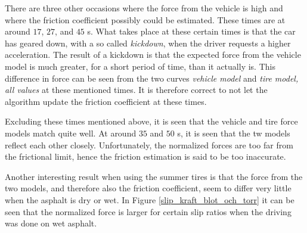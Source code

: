 There are three other occasions where the force from the vehicle is high and where the friction coefficient possibly could be estimated. These times are at around $ 17 $, $ 27 $, and $ 45 $ s. What takes place at these certain times is that the car has geared down, with a so called \textit{kickdown}, when the driver requests a higher acceleration. The result of a kickdown is that the expected force from the vehicle model is much greater, for a short period of time, than it actually is. This difference in force can be seen from the two curves \textit{vehicle model} and \textit{tire model, all values} at these mentioned times. It is therefore correct to not let the algorithm update the friction coefficient at these times.

Excluding these times mentioned above, it is seen that the vehicle and tire force models match quite well. At around $ 35 $ and $ 50 $ s, it is seen that the tw models reflect each other closely. Unfortunately, the normalized forces are too far from the frictional limit, hence the friction estimation is said to be too inaccurate. 

Another interesting result when using the summer tires is that the force from the two models, and therefore also the friction coefficient, seem to differ very little when the asphalt is dry or wet. In Figure \ref{slip_kraft_blot_och_torr} it can be seen that the normalized force is larger for certain slip ratios when the driving was done on wet asphalt.
